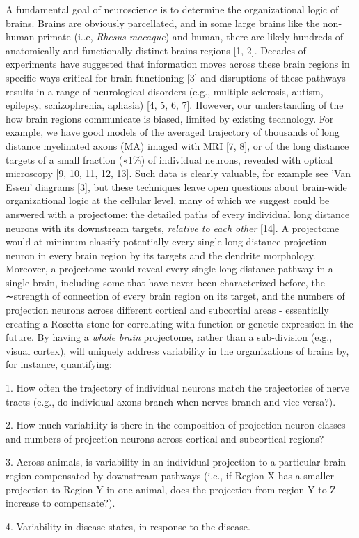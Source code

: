 \documentclass{article}
\begin{document}
A fundamental goal of neuroscience is to determine the organizational logic of brains. Brains are obviously parcellated, and in some large brains like the non-human primate (i..e, \emph{Rhesus macaque}) and human, there are likely hundreds of anatomically and functionally distinct brains regions [1, 2]. Decades of experiments have suggested that information moves across these brain regions in specific ways critical for brain functioning [3] and disruptions of these pathways results in a range of neurological disorders (e.g., multiple sclerosis, autism, epilepsy, schizophrenia, aphasia) [4, 5, 6, 7]. However, our understanding of the how brain regions communicate is biased, limited by existing technology. For example, we have good models of the averaged trajectory of thousands of long distance myelinated axons (MA) imaged with MRI [7, 8], or of the long distance targets of a small fraction («1\%) of individual neurons, revealed with optical microscopy [9, 10, 11, 12, 13]. Such data is clearly valuable, for example see ’Van Essen’ diagrams [3], but these techniques leave open questions about brain-wide organizational logic at the cellular level, many of which we suggest could be answered with a projectome: the detailed paths of every individual long distance neurons with its downstream targets, \emph{relative to each other} [14]. A projectome would at minimum classify potentially every single long distance projection neuron in every brain region by its targets and the dendrite morphology. Moreover, a projectome would reveal every single long distance pathway in a single brain, including some that have never been characterized before, the ∼strength of connection of every brain region on its target, and the numbers of projection neurons across different cortical and subcortial areas - essentially creating a Rosetta stone for correlating with function or genetic expression in the future. By having a \emph{whole brain} projectome, rather than a sub-division (e.g., visual cortex), will uniquely address variability in the organizations of brains by, for instance, quantifying:


\begin{hangpars}\setlength{\parindent}{0pt}
1. How often the trajectory of individual neurons match the trajectories of nerve tracts (e.g., do individual axons branch when nerves branch and vice versa?).

2. How much variability is there in the composition of projection neuron classes and numbers of projection neurons across cortical and subcortical regions?

3. Across animals, is variability in an individual projection to a particular brain region compensated by downstream pathways (i.e., if Region X has a smaller projection to Region Y in one animal, does the projection from region Y to Z increase to compensate?).

4. Variability in disease states, in response to the disease.
\end{hangpars}
\end{document}

